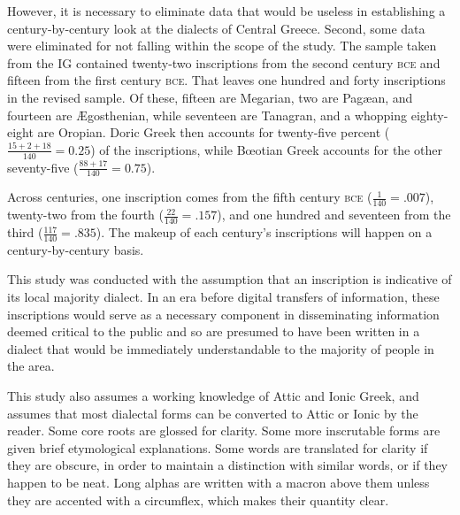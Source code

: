 However, 
it is necessary to eliminate data that would be useless in establishing a century-by-century look at the dialects of Central Greece.
Second, some data were eliminated for not falling within the scope of the study. 
The sample taken from the IG contained twenty-two inscriptions from the second century \textsc{bce}
and fifteen from the first century \textsc{bce}. 
That leaves one hundred and forty inscriptions in the revised sample. 
Of these, fifteen are Megarian, 
two are Pagæan, 
and fourteen are Ægosthenian, 
while seventeen are Tanagran, 
and a whopping eighty-eight are Oropian. 
Doric Greek then accounts for twenty-five percent ($\frac{15+2+18}{140}=0.25$) of the inscriptions, 
while Bœotian Greek accounts for the other seventy-five ($\frac{88+17}{140}=0.75$). 

Across centuries, one inscription comes from the fifth century \textsc{bce} ($\frac{1}{140}=.007$),
twenty-two from the fourth ($\frac{22}{140}=.157$),
and one hundred and seventeen from the third ($\frac{117}{140}=.835$).
The makeup of each century's inscriptions will happen on a century-by-century basis. 

This study was conducted with the assumption that an inscription is indicative of its local majority dialect. 
In an era before digital transfers of information, 
these inscriptions would serve as a necessary component in disseminating information deemed critical to the public
and so are presumed to have been written in a dialect that would be immediately understandable to the majority of people in the area. 

This study also assumes a working knowledge of Attic and Ionic Greek, 
and assumes that most dialectal forms can be converted to Attic or Ionic by the reader.
 Some core roots are glossed for clarity. 
 Some more inscrutable forms are given brief etymological explanations. 
 Some words are translated for clarity if they are obscure, 
 in order to maintain a distinction with similar words, 
 or if they happen to be neat. 
 Long alphas are written with a macron above them unless they are accented with a circumflex, 
 which makes their quantity clear.

